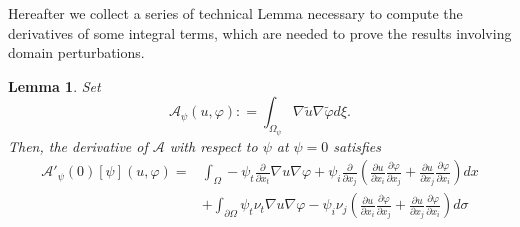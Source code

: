 \documentclass[a4paper,reqno,11pt,oneside]{amsart}
\theoremstyle{plain}
\theoremstyle{plain}
\newtheorem{lem}[thm]{Lemma}
\theoremstyle{plain}
\theoremstyle{remark}
\begin{document}
Hereafter we collect a series of technical Lemma necessary to compute the derivatives of some integral terms, which are needed to prove the results involving domain perturbations. 


\begin{lem}\label{lem:Astorto} Set $$
\mathcal{A}_\psi(u,\varphi):
=\int_{\Omega_\psi} \nabla \tilde u\nabla \tilde \varphi d\xi.$$ 
Then, the derivative of $\mathcal{A}$ with respect to $\psi$ at $\psi=0$ satisfies
\begin{eqnarray*}
    \mathcal{A}'_\psi(0)[\psi](u,\varphi)=
&\int_\Omega-\psi_t \frac{\partial}{\partial x_t} \nabla u\nabla \varphi + \psi_i\frac{\partial }{ \partial x_j}\left(\frac{\partial u}{\partial x_i}\frac{\partial \varphi}{\partial x_j}+
\frac{\partial u}{\partial x_j}\frac{\partial \varphi}{\partial x_i}
\right) dx\\
&+\int_{\partial\Omega}\psi_t \nu_t \nabla u\nabla \varphi -
\psi_i \nu_j\left(\frac{\partial u}{\partial x_i}\frac{\partial \varphi}{\partial x_j}+\frac{\partial u}{\partial x_j}\frac{\partial \varphi}{\partial x_i}
\right) d\sigma
\end{eqnarray*} 
\end{lem}
\end{document}
